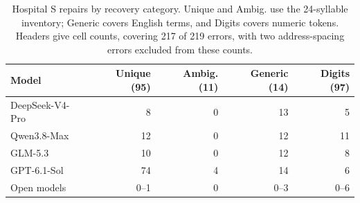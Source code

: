 \begin{table}[t]
  \caption{Hospital S repairs by recovery category. Unique and Ambig. use the 24-syllable inventory;
  Generic covers English terms, and Digits covers numeric tokens. Headers give cell counts, covering
  217 of 219 errors, with two address-spacing errors excluded from these counts.}
  \label{tab:decoding}
  \small
  \setlength{\tabcolsep}{4pt}
  \begin{tabular}{@{}lrrrr@{}}
    \toprule
    Model & Unique (95) & Ambig. (11) & Generic (14) & Digits (97) \\
    \midrule
    DeepSeek-V4-Pro & 8 & 0 & 13 & 5 \\
    Qwen3.8-Max & 12 & 0 & 12 & 11 \\
    GLM-5.3 & 10 & 0 & 12 & 8 \\
    GPT-6.1-Sol & 74 & 4 & 14 & 6 \\
    Open models & 0--1 & 0 & 0--3 & 0--6 \\
    \bottomrule
  \end{tabular}
\end{table}
